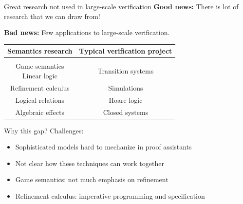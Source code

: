 \documentclass[aspectratio=54]{beamer}
\begin{document}
\begin{frame}{Great research not used in large-scale verification} %
  \textbf{Good news:}
  There is lot of research that we can draw from!

  \textbf{Bad news:}
  Few applications to
  large-scale verification.

  \vfill
  \begin{center}
    \begin{tabular}{cc}
      \hline
      Semantics research &
      Typical verification project
      \\
      \hline
      \\[-1ex]
      \parbox{10em}{\centering Game semantics \\ Linear logic} &
      Transition systems \\[1em]
      Refinement calculus &
      Simulations \\[1em]
      Logical relations &
      Hoare logic \\[1em]
      Algebraic effects &
      Closed systems \\[1em]
      \hline
    \end{tabular}
  \end{center}
\end{frame}

\begin{frame}{Why this gap?} %
  Challenges:
  \begin{itemize}
    \item Sophisticated models hard to mechanize in proof assistants
    \item Not clear how these techniques can work together
    \item Game semantics: not much emphasis on refinement
    \item Refinement calculus: imperative programming and specification
  \end{itemize}
\end{frame}  
\end{document}
